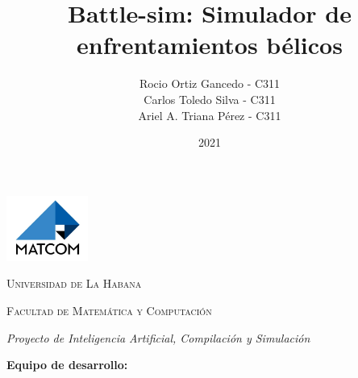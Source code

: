 \documentclass[letterpaper,12pt, oneside, onecolumn, openany]{book}
\begin{document}

\title{Battle-sim: Simulador de enfrentamientos bélicos}
\author{Rocio Ortiz Gancedo - C311\\Carlos Toledo Silva - C311\\Ariel A. Triana Pérez - C311}
\date{2021}

\makeatletter

    \begin{titlepage}
        \centering
        
        \includegraphics[width=0.2\textwidth]{./chapters/img/logo-matcom.jpg}
        
        \vspace{0.5cm}
        
        {\scshape \LARGE Universidad de La Habana \par}
        {\scshape \Large Facultad de Matemática y Computación \par}
        
        \vspace{6.5cm}
        
        {\bfseries \Huge \textbf{\@title} \par}
        \vspace{0.2cm}
        \textit{Proyecto de Inteligencia Artificial, Compilación y Simulación}
        
        \vfill
        
        \textbf{Equipo de desarrollo:}
        
        \@author
        
        \vspace{1cm}
        
        \@date
    \end{titlepage}

    \tableofcontents

    \mainmatter
    
    
    
    
    \backmatter
\end{document}
